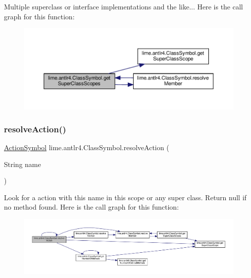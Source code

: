 Multiple superclass or interface implementations and the like... Here is the call graph for this function\+:
\nopagebreak
\begin{figure}[H]
\begin{center}
\leavevmode
\includegraphics[width=350pt]{classlime_1_1antlr4_1_1ClassSymbol_a6505cf7d9bbc2b32620eab9e20ddb881_cgraph}
\end{center}
\end{figure}
\mbox{\label{classlime_1_1antlr4_1_1ClassSymbol_a5f03ec543ef043695007844d15614b2c}} 
\subsubsection{\texorpdfstring{resolve\+Action()}{resolveAction()}}
{\footnotesize\ttfamily \hyperlink{classlime_1_1antlr4_1_1ActionSymbol}{Action\+Symbol} lime.\+antlr4.\+Class\+Symbol.\+resolve\+Action (\begin{DoxyParamCaption}\item[{String}]{name }\end{DoxyParamCaption})}

Look for a action with this name in this scope or any super class. Return null if no method found. Here is the call graph for this function\+:
\nopagebreak
\begin{figure}[H]
\begin{center}
\leavevmode
\includegraphics[width=350pt]{classlime_1_1antlr4_1_1ClassSymbol_a5f03ec543ef043695007844d15614b2c_cgraph}
\end{center}
\end{figure}
\mbox{\label{classlime_1_1antlr4_1_1ClassSymbol_a3b5e6abcf9e0c8be368f0aa77f58db1e}} 
